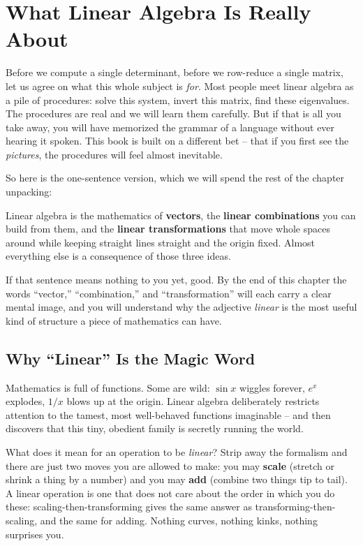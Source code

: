 \chapter{What Linear Algebra Is Really About}

Before we compute a single determinant, before we row-reduce a single matrix, let us agree on what
this whole subject is \emph{for}. Most people meet linear algebra as a pile of procedures: solve
this system, invert this matrix, find these eigenvalues. The procedures are real and we will learn
them carefully. But if that is all you take away, you will have memorized the grammar of a language
without ever hearing it spoken. This book is built on a different bet -- that if you first see the
\emph{pictures}, the procedures will feel almost inevitable.

So here is the one-sentence version, which we will spend the rest of the chapter unpacking:

\begin{focusbox}
Linear algebra is the mathematics of \textbf{vectors}, the \textbf{linear combinations} you can
build from them, and the \textbf{linear transformations} that move whole spaces around while keeping
straight lines straight and the origin fixed. Almost everything else is a consequence of those three
ideas.
\end{focusbox}

If that sentence means nothing to you yet, good. By the end of this chapter the words
``vector,'' ``combination,'' and ``transformation'' will each carry a clear mental image, and you
will understand why the adjective \emph{linear} is the most useful kind of structure a piece of
mathematics can have.

\section{Why ``Linear'' Is the Magic Word}

Mathematics is full of functions. Some are wild: $\sin x$ wiggles forever, $e^x$ explodes,
$1/x$ blows up at the origin. Linear algebra deliberately restricts attention to the tamest,
most well-behaved functions imaginable -- and then discovers that this tiny, obedient family is
secretly running the world.

What does it mean for an operation to be \emph{linear}? Strip away the formalism and there are just
two moves you are allowed to make: you may \textbf{scale} (stretch or shrink a thing by a number) and
you may \textbf{add} (combine two things tip to tail). A linear operation is one that does not care
about the order in which you do these: scaling-then-transforming gives the same answer as
transforming-then-scaling, and the same for adding. Nothing curves, nothing kinks, nothing surprises
you.

